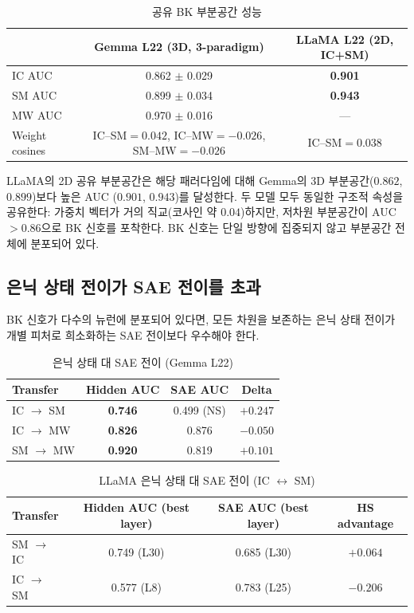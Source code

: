 \documentclass[11pt,a4paper]{article}
\begin{document}
\begin{table}[H]
\centering
\caption{공유 BK 부분공간 성능}\label{tab:t10}
\footnotesize
\begin{tabular}{lcc}
\toprule
 & Gemma L22 (3D, 3-paradigm) & LLaMA L22 (2D, IC+SM) \\
\midrule
IC AUC & 0.862 $\pm$ 0.029 & \textbf{0.901} \\
SM AUC & 0.899 $\pm$ 0.034 & \textbf{0.943} \\
MW AUC & 0.970 $\pm$ 0.016 & --- \\
Weight cosines & IC--SM$=0.042$, IC--MW$=-0.026$, SM--MW$=-0.026$ & IC--SM$=\mathbf{0.038}$ \\
\bottomrule
\end{tabular}
\end{table}

\noindent LLaMA의 2D 공유 부분공간은 해당 패러다임에 대해 Gemma의 3D 부분공간($0.862$, $0.899$)보다 높은 AUC ($0.901$, $0.943$)를 달성한다. 두 모델 모두 동일한 구조적 속성을 공유한다: 가중치 벡터가 거의 직교(코사인 약 $0.04$)하지만, 저차원 부분공간이 AUC $> 0.86$으로 BK 신호를 포착한다. BK 신호는 단일 방향에 집중되지 않고 부분공간 전체에 분포되어 있다.

\subsection{은닉 상태 전이가 SAE 전이를 초과}

BK 신호가 다수의 뉴런에 분포되어 있다면, 모든 차원을 보존하는 은닉 상태 전이가 개별 피처로 희소화하는 SAE 전이보다 우수해야 한다.

\begin{table}[H]
\centering
\caption{은닉 상태 대 SAE 전이 (Gemma L22)}\label{tab:t11}
\footnotesize
\begin{tabular}{lccc}
\toprule
Transfer & Hidden AUC & SAE AUC & Delta \\
\midrule
IC $\rightarrow$ SM & \textbf{0.746} & 0.499 (NS) & $+0.247$ \\
IC $\rightarrow$ MW & \textbf{0.826} & 0.876 & $-0.050$ \\
SM $\rightarrow$ MW & \textbf{0.920} & 0.819 & $+0.101$ \\
\bottomrule
\end{tabular}
\end{table}

\begin{table}[H]
\centering
\caption{LLaMA 은닉 상태 대 SAE 전이 (IC $\leftrightarrow$ SM)}\label{tab:t12}
\footnotesize
\begin{tabular}{lccc}
\toprule
Transfer & Hidden AUC (best layer) & SAE AUC (best layer) & HS advantage \\
\midrule
SM $\rightarrow$ IC & 0.749 (L30) & 0.685 (L30) & $+0.064$ \\
IC $\rightarrow$ SM & 0.577 (L8) & 0.783 (L25) & $-0.206$ \\
\bottomrule
\end{tabular}
\end{table}
\end{document}

